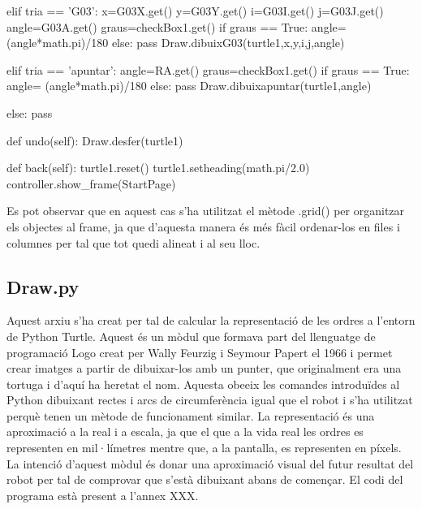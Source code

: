 \begin{python}
				elif tria == 'G03':
					x=G03X.get()
					y=G03Y.get()
					i=G03I.get()
					j=G03J.get()
					angle=G03A.get()
					graus=checkBox1.get()
					if graus == True:
						angle= (angle*math.pi)/180
					else:
						pass
					Draw.dibuixG03(turtle1,x,y,i,j,angle)
				
				elif tria == 'apuntar':
					angle=RA.get()
					graus=checkBox1.get()
					if graus == True:
						angle= (angle*math.pi)/180
					else:
						pass
					Draw.dibuixapuntar(turtle1,angle)
				
				else:
					pass
			
			def undo(self):
				Draw.desfer(turtle1)
			
			
			def back(self):
				turtle1.reset()
				turtle1.setheading(math.pi/2.0)
				controller.show_frame(StartPage)
\end{python}

Es pot observar que en aquest cas s’ha utilitzat el mètode .grid() per organitzar els objectes al frame, ja que d’aquesta manera és més fàcil ordenar-los en files i columnes per tal que tot quedi alineat i al seu lloc.

\subsection{Draw.py} \label{sec:Draw}

Aquest arxiu s’ha creat per tal de calcular la representació de les ordres a l’entorn de Python Turtle. Aquest és un mòdul que formava part del llenguatge de programació Logo creat per Wally Feurzig i Seymour Papert el 1966 i permet crear imatges a partir de dibuixar-los amb un punter, que originalment era una tortuga i d’aquí ha heretat el nom. Aquesta obeeix les comandes introduïdes al Python dibuixant rectes i arcs de circumferència igual que el robot i s’ha utilitzat perquè tenen un mètode de funcionament similar. La representació és una aproximació a la real i a escala, ja que el que a la vida real les ordres es representen en mil·límetres mentre que, a la pantalla, es representen en píxels. La intenció d’aquest mòdul és donar una aproximació visual del futur resultat del robot per tal de comprovar que s’està dibuixant abans de començar. El codi del programa està present a l'annex XXX. 

